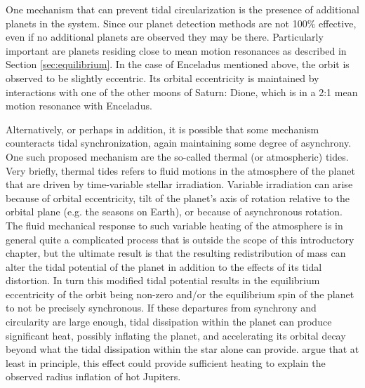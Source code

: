 One mechanism that can prevent tidal circularization is the presence of
additional planets in the system. Since our planet detection methods are not
100\% effective, even if no additional planets are observed they may be there.
Particularly important are planets residing close to mean motion resonances as
described in Section \ref{sec:equilibrium}. In the case of Enceladus mentioned
above, the orbit is observed to be slightly eccentric. Its orbital eccentricity
is maintained by interactions with one of the other moons of Saturn: Dione,
which is in a 2:1 mean motion resonance with Enceladus.

Alternatively, or perhaps in addition, it is possible that some mechanism
counteracts tidal synchronization, again maintaining some degree of asynchrony.
One such proposed mechanism are the so-called thermal (or atmospheric) tides.
Very briefly, thermal tides refers to fluid motions in the atmosphere of the
planet that are driven by time-variable stellar irradiation. Variable
irradiation can arise because of orbital eccentricity, tilt of the planet's axis
of rotation relative to the orbital plane (e.g. the seasons on Earth), or
because of asynchronous rotation. The fluid mechanical response to such variable
heating of the atmosphere is in general quite a complicated process that is
outside the scope of this introductory chapter, but the ultimate result is that
the resulting redistribution of mass can alter the tidal potential of the planet
in addition to the effects of its tidal distortion. In turn this modified tidal
potential results in the equilibrium eccentricity of the orbit being non-zero
and/or the equilibrium spin of the planet to not be precisely synchronous. If
these departures from synchrony and circularity are large enough, tidal
dissipation within the planet can produce significant heat, possibly inflating
the planet, and accelerating its orbital decay beyond what the tidal dissipation
within the star alone can provide. \citet{Arras_Socrates_10} argue that at
least in principle, this effect could provide sufficient heating to explain the
observed radius inflation of hot Jupiters.
